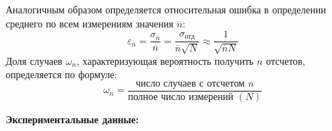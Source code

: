 \documentclass[a4paper,12pt]{article} %
\begin{document}
Аналогичным образом определяется относительная ошибка в определении среднего по всем измерениям значения $\overline{n}$:
\begin{equation}
\label{8}
\varepsilon_{\overline{n}} = \frac{\sigma_{\overline{n}}}{\overline{n}} = \frac{\sigma_\text{отд}}{\overline{n} \sqrt{N}} \approx \frac{1}{\sqrt{\overline{n}N}}
\end{equation}
Доля случаев $\omega_n$, характеризующая вероятность получить $n$ отсчетов, определяется по формуле:
\begin{equation}
\label{9}
\omega_n = \frac{\text{число случаев с отсчетом }n}{\text{полное число измерений }(N)}
\end{equation}



\newpage
\textbf{Экспериментальные данные:}
\end{document}
